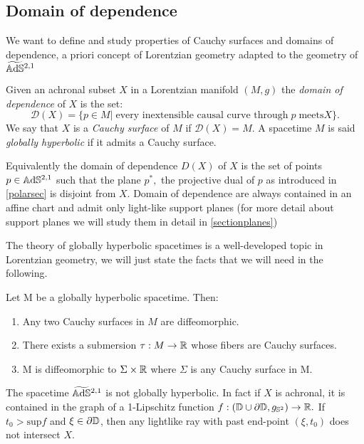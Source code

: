 \subsection{Domain of dependence}
We want to define and study properties of Cauchy surfaces and domains of dependence, a priori concept of Lorentzian geometry adapted to the geometry of $\widetilde{\mathbb{A}\mathrm{d}\mathbb{S}}{}^{2,1}$

\begin{definition}
    Given an achronal subset $X$ in a Lorentzian manifold $(M,g)$ the \textit{domain of dependence} of $X$ is the set: 
    \[
        \mathcal{D}(X)=\{p\in M |\;\text{every inextensible causal curve through}\; p\; \text{meets} X \}.
    \]
    We say that $X$ is a \textit{Cauchy surface} of $M$ if $\mathcal{D}(X)=M$. A spacetime $M$ is said \textit{globally hyperbolic} if it admits a Cauchy surface.
\end{definition}

\begin{observation}
    Equivalently the domain of dependence  $D(X)$ of $X$ is the set of points $p\in\mathbb{A}\mathrm{d}\mathbb{S}^{2,1}$ such that the plane $p^*,$ the projective dual of $p$ as introduced in \ref{polarsec} is disjoint from $X.$ Domain of dependence are always contained in an affine chart and admit only light-like support planes (for more detail about support planes we will study them in detail in \ref{sectionplanes})
\end{observation}

The theory of globally hyperbolic spacetimes is a well-developed topic in Lorentzian geometry, we will just state the facts that we will need in the following. 

\begin{theorem}\label{442}
    Let M be a globally hyperbolic spacetime. Then:
    \begin{enumerate}
        \item Any two Cauchy surfaces in $M$ are diffeomorphic. 
        \item There exists a submersion $\tau:M\to\mathbb{R}$ whose fibers are Cauchy surfaces.
        \item M is diffeomorphic to $\Sigma\times\mathbb{R}$ where $\Sigma$ is any Cauchy surface in M.
    \end{enumerate}
\end{theorem}

\begin{observation}
    The spacetime $\widetilde{\mathbb{A}\mathrm{d}\mathbb{S}}{}^{2,1}$ is not globally hyperbolic. In fact if $X$ is achronal, it is contained in the graph of a 1-Lipschitz function $f:(\mathbb{D}\cup\partial\mathbb{D},g_{\mathbb{S}^2})\to\mathbb{R}.$ If $t_0>\text{sup}f$ and $\xi \in \partial\mathbb{D}$, then any lightlike ray with past end-point $(\xi,t_0)$ does not intersect $X.$ 
\end{observation}

